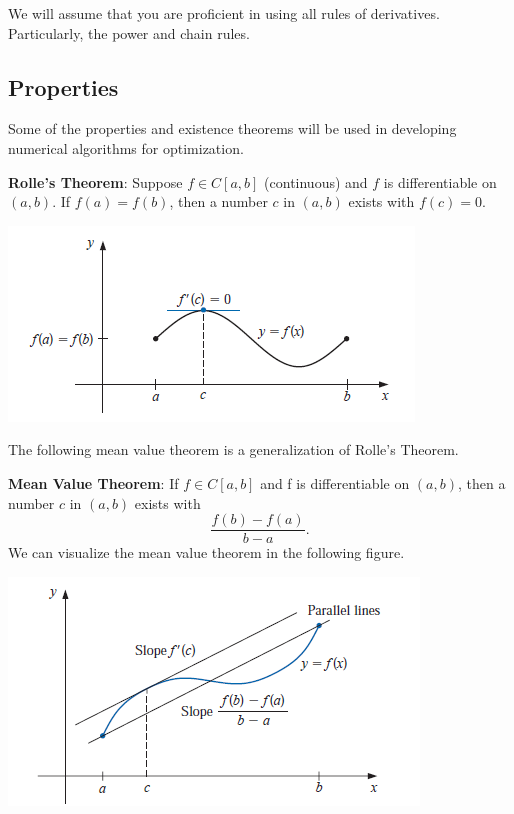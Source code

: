 \documentclass[
]{book}
\begin{document}
We will assume that you are proficient in using all rules of derivatives. Particularly, the power and chain rules.

\hypertarget{properties}{%
\subsection{Properties}\label{properties}}

Some of the properties and existence theorems will be used in developing numerical algorithms for optimization.

\textbf{Rolle's Theorem}: Suppose \(f \in C[a, b]\) (continuous) and \(f\) is differentiable on \((a, b)\). If \(f (a) = f (b)\), then a number \(c\) in \((a, b)\) exists with \(f(c) = 0\).

\begin{center}\includegraphics[width=0.75\linewidth]{img01/w01-RolleTheorem} \end{center}

The following mean value theorem is a generalization of Rolle's Theorem.

\textbf{Mean Value Theorem}: If \(f \in C[a, b]\) and f is differentiable on \((a, b)\), then a number \(c\) in \((a, b)\) exists with
\[
\frac{f(b) - f(a)}{b - a}.
\]
We can visualize the mean value theorem in the following figure.

\begin{center}\includegraphics[width=0.75\linewidth]{img01/w01-MeanValue} \end{center}
\end{document}
